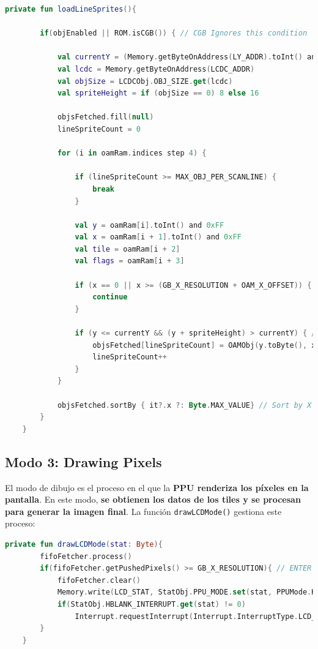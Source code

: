 \begin{lstlisting}[language=Kotlin, caption={Obtención de sprites en modo OAM Scan.}, label={code:ppuoamscansprites}]
    private fun loadLineSprites(){

        if(objEnabled || ROM.isCGB()) { // CGB Ignores this condition

            val currentY = (Memory.getByteOnAddress(LY_ADDR).toInt() and 0xFF) + OAM_Y_OFFSET
            val lcdc = Memory.getByteOnAddress(LCDC_ADDR)
            val objSize = LCDCObj.OBJ_SIZE.get(lcdc)
            val spriteHeight = if (objSize == 0) 8 else 16

            objsFetched.fill(null)
            lineSpriteCount = 0

            for (i in oamRam.indices step 4) {

                if (lineSpriteCount >= MAX_OBJ_PER_SCANLINE) {
                    break
                }

                val y = oamRam[i].toInt() and 0xFF
                val x = oamRam[i + 1].toInt() and 0xFF
                val tile = oamRam[i + 2]
                val flags = oamRam[i + 3]

                if (x == 0 || x >= (GB_X_RESOLUTION + OAM_X_OFFSET)) { // Sprite not visible
                    continue
                }

                if (y <= currentY && (y + spriteHeight) > currentY) { // Sprite on current line
                    objsFetched[lineSpriteCount] = OAMObj(y.toByte(), x.toByte(), tile, flags)
                    lineSpriteCount++
                }
            }

            objsFetched.sortBy { it?.x ?: Byte.MAX_VALUE} // Sort by X position
        }
    }
\end{lstlisting}

\subsection{Modo 3: Drawing Pixels}

El modo de dibujo es el proceso en el que la \textbf{PPU renderiza los píxeles en la pantalla}. En este modo, \textbf{se obtienen los datos de los tiles y se procesan para generar la imagen final}. La función \texttt{drawLCDMode()} gestiona este proceso:

\begin{lstlisting}[language=Kotlin, caption={Dibujado de píxeles en Modo 3.}, label={code:ppuoamdrawpixels}]
    private fun drawLCDMode(stat: Byte){
        fifoFetcher.process()
        if(fifoFetcher.getPushedPixels() >= GB_X_RESOLUTION){ // ENTER HBLANK MODE
            fifoFetcher.clear()
            Memory.write(LCD_STAT, StatObj.PPU_MODE.set(stat, PPUMode.HBlank.number))
            if(StatObj.HBLANK_INTERRUPT.get(stat) != 0)
                Interrupt.requestInterrupt(Interrupt.InterruptType.LCD_STAT.getByteMask()) // ASK FOR LCD STAT INTERRUPT IF LCD_STAT HAS THE HBLANK BIT ACTIVATED
        }
    }
\end{lstlisting}

